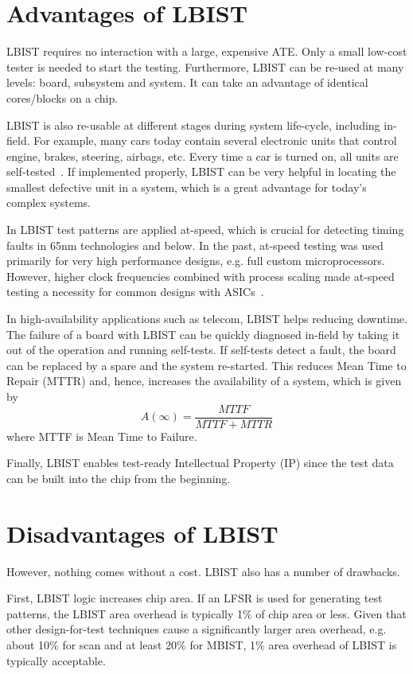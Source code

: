 \documentclass[conference]{IEEEtran}
\begin{document}
\section{Advantages of LBIST} \label{adv}

LBIST requires no interaction with a large, expensive ATE. Only a small low-cost tester is needed to start the testing. Furthermore, LBIST can be re-used at many levels: board, subsystem and system. It can take an advantage of identical cores/blocks on a chip. 

LBIST is also re-usable at different stages during system life-cycle, including in-field.
For example, many cars today contain several electronic units that control engine, brakes, steering, airbags, etc. Every time a car is turned on, all units are self-tested~\cite{MePZ12}. 
If implemented properly, LBIST can be very helpful in locating the smallest defective unit in a system, which is a great advantage for today's complex systems.


In LBIST test patterns are applied at-speed, which is crucial for detecting timing faults in 65nm technologies and below. In the past, at-speed testing was used primarily for very high performance designs, e.g. full custom microprocessors. However, higher clock frequencies combined with process scaling made at-speed testing a necessity for common designs with ASICs~\cite{Ma13}.

In high-availability applications such as telecom, LBIST helps reducing downtime. 
The failure of a board with LBIST can be quickly diagnosed in-field by taking it out of the operation and running self-tests. If self-tests detect a fault, the board can be replaced by a spare and the system re-started. This reduces Mean Time to Repair (MTTR) and, hence, increases 
the availability of a system, which is given by
\[
A(\infty) = \frac{MTTF}{MTTF+MTTR}
\]
where MTTF is Mean Time to Failure.

Finally, LBIST enables test-ready Intellectual Property (IP) since the test data can be built into the chip from the beginning. 



\section{Disadvantages of LBIST} \label{dis}

However, nothing comes without a cost. LBIST also has a number of drawbacks.

First, LBIST logic increases chip area. If an LFSR is used for generating test patterns, the LBIST area overhead is typically 1\% of chip area or less. Given that other design-for-test techniques cause a significantly larger area overhead, e.g. about 10\% for scan and at least 20\% for MBIST, 1\% area overhead of LBIST is typically acceptable.
\end{document}
